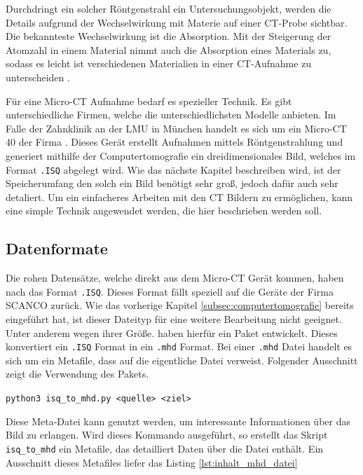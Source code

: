 Durchdringt ein solcher Röntgenstrahl ein Untersuchungsobjekt, werden die
Details aufgrund der Wechselwirkung mit Materie auf einer CT-Probe sichtbar. Die
bekannteste Wechselwirkung ist die Absorption. Mit der Steigerung der Atomzahl
in einem Material nimmt auch die Absorption eines Materials zu, sodass es leicht
ist verschiedenen Materialien in einer CT-Aufnahme zu unterscheiden \citep[vgl.][]{nib2024}.

Für eine Micro-CT Aufnahme bedarf es spezieller Technik. Es gibt unterschiedliche
Firmen, welche die unterschiedlichsten Modelle anbieten. Im Falle der Zahnklinik
an der LMU in München handelt es sich um ein Micro-CT 40 der Firma \citet{scanco2024}.
Dieses Gerät erstellt Aufnahmen mittels Röntgenstrahlung und generiert mithilfe der
Computertomografie ein dreidimensionales Bild, welches im Format \texttt{.ISQ} abgelegt
wird. Wie das nächste Kapitel beschreiben wird, ist der Speicherumfang den solch
ein Bild benötigt sehr groß, jedoch dafür auch sehr detaliert. Um ein einfacheres
Arbeiten mit den CT Bildern zu ermöglichen, kann eine simple Technik angewendet
werden, die hier beschrieben werden soll.

\subsection{Datenformate}
\label{subsec:datensätze} Die rohen Datensätze, welche direkt aus dem Micro-CT
Gerät kommen, haben nach \citet{scanco2024} das Format \texttt{.ISQ}. Dieses
Format fällt speziell auf die Geräte der Firma SCANCO zurück. Wie das vorherige Kapitel
\ref{subsec:computertomografie} bereits eingeführt hat, ist dieser Dateityp für
eine weitere Bearbeitung nicht geeignet. Unter anderem wegen ihrer Größe. \citet{RoeschKunzelmann2018}
haben hierfür ein Paket entwickelt. Dieses konvertiert ein \texttt{.ISQ} Format in
ein \texttt{.mhd} Format. Bei einer \texttt{.mhd} Datei handelt es sich um ein
Metafile, dass auf die eigentliche Datei verweist. Folgender Ausschnitt zeigt
die Verwendung des Pakets.

\texttt{python3 isq\_to\_mhd.py <quelle> <ziel>}

Diese Meta-Datei kann genutzt werden, um interessante Informationen über das Bild
zu erlangen. Wird dieses Kommando ausgeführt, so erstellt das Skript \texttt{isq\_to\_mhd}
ein Metafile, das detailliert Daten über die Datei enthält. Ein Ausschnitt
dieses Metafiles liefer das Listing \ref{lst:inhalt_mhd_datei}

